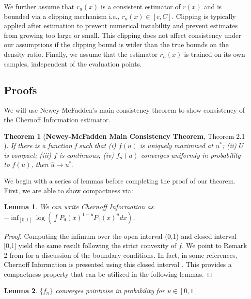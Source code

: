 \documentclass[11pt,letterpaper]{article}
\newtheorem{theorem}{Theorem}
\newtheorem{lemma}{Lemma}
\begin{document}
We further assume that $r_n(x)$ is a consistent estimator of $r(x)$ and is bounded via a clipping mechanism i.e., $r_n(x) \in [c,C]$. Clipping is typically applied after estimation to prevent numerical instability and prevent estimates from growing too large or small. This clipping does not affect consistency under our assumptions if the clipping bound is wider than the true bounds on the density ratio. Finally, we assume that the estimator $r_n(x)$ is trained on its own samples, independent of the evaluation points.





\subsection{Proofs}

We will use Newey-McFadden's main consistency theorem to show consistency of the Chernoff Information estimator.


\begin{theorem}[\textbf{Newey-McFadden Main Consistency Theorem}, Theorem 2.1 \citep{newey1994large}]\label{thm:newmcf} If there is a function f such that (i) $f(u)$ is uniquely maximized at $u^*$; (ii) $U$ is compact; (iii) $f$ is continuous; (iv) $f_n(u)$ converges uniformly in probability to $f(u)$, then $\hat{u}\rightarrow u^*$.
\end{theorem}

We begin with a series of lemmas before completing the proof of our theorem. First, we are able to show compactness via: 

\begin{lemma} \label{lem:closed}
    We can write Chernoff Information as $-\inf_{[0,1]}\log(\int P_0(x)^{1-u}P_1(x)^udx)$.
\end{lemma}

\begin{proof}
    Computing the infimum over the open interval (0,1) and closed interval [0,1] yield the same result following the strict convexity of 
$f$. We point to Remark 2 from \citet{nielsen2022revisiting} for a discussion of the boundary conditions. In fact, in some references, Chernoff Information is presented using this closed interval \citep{cover1999elements}. This provides a compactness property that can be utilized in the following lemmas.
\end{proof}

\begin{lemma} \label{ref:pointwise}
    $\{f_n\}$ converges pointwise in probability for $u \in [0,1]$
\end{lemma}
\end{document}
